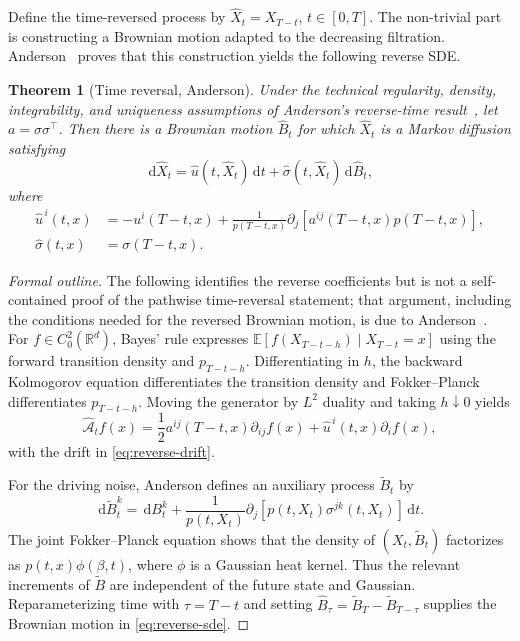 \documentclass[12pt,a4paper]{report}
\theoremstyle{plain}
\newtheorem{theorem}{Theorem}[chapter]
\theoremstyle{definition}
\newcommand{\R}{\mathbb{R}}
\newcommand{\E}{\mathbb{E}}
\newcommand{\dd}{\,\mathrm{d}}
\begin{document}
Define the time-reversed process by $\hat X_t=X_{T-t}$, $t\in[0,T]$. The non-trivial part is constructing a Brownian motion adapted to the decreasing filtration. Anderson~\cite{Anderson1982} proves that this construction yields the following reverse SDE.
\begin{theorem}[Time reversal, Anderson]\label{thm:reverse}
Under the technical regularity, density, integrability, and uniqueness assumptions of Anderson's reverse-time result~\cite{Anderson1982}, let $a=\sigma\sigma^\top$. Then there is a Brownian motion $\hat B_t$ for which $\hat X_t$ is a Markov diffusion satisfying
\begin{equation}\dd\hat X_t=\hat u(t,\hat X_t)\dd t+\hat\sigma(t,\hat X_t)\dd\hat B_t,\label{eq:reverse-sde}\end{equation}
where
\begin{align}\hat u^{\,i}(t,x)&=-u^i(T-t,x)+\frac{1}{p(T-t,x)}\partial_j\left[a^{ij}(T-t,x)p(T-t,x)\right],\label{eq:reverse-drift}\\
\hat\sigma(t,x)&=\sigma(T-t,x).\nonumber\end{align}
\end{theorem}
\begin{proof}[Formal outline]
The following identifies the reverse coefficients but is not a self-contained proof of the pathwise time-reversal statement; that argument, including the conditions needed for the reversed Brownian motion, is due to Anderson~\cite{Anderson1982}.
For $f\in C_0^2(\R^d)$, Bayes' rule expresses $\E[f(X_{T-t-h})\mid X_{T-t}=x]$ using the forward transition density and $p_{T-t-h}$. Differentiating in $h$, the backward Kolmogorov equation differentiates the transition density and Fokker--Planck differentiates $p_{T-t-h}$. Moving the generator by $L^2$ duality and taking $h\downarrow0$ yields
\[\hat{\mathcal A}_t f(x)=\frac12a^{ij}(T-t,x)\partial_{ij}f(x)+\hat u^{\,i}(t,x)\partial_i f(x),\]
with the drift in \eqref{eq:reverse-drift}.

For the driving noise, Anderson defines an auxiliary process $\tilde B_t$ by
\[\dd\tilde B_t^k=\dd B_t^k+\frac{1}{p(t,X_t)}\partial_j[p(t,X_t)\sigma^{jk}(t,X_t)]\dd t.\]
The joint Fokker--Planck equation shows that the density of $(X_t,\tilde B_t)$ factorizes as $p(t,x)\phi(\beta,t)$, where $\phi$ is a Gaussian heat kernel. Thus the relevant increments of $\tilde B$ are independent of the future state and Gaussian. Reparameterizing time with $\tau=T-t$ and setting $\hat B_\tau=\tilde B_T-\tilde B_{T-\tau}$ supplies the Brownian motion in \eqref{eq:reverse-sde}.
\end{proof}
\end{document}
